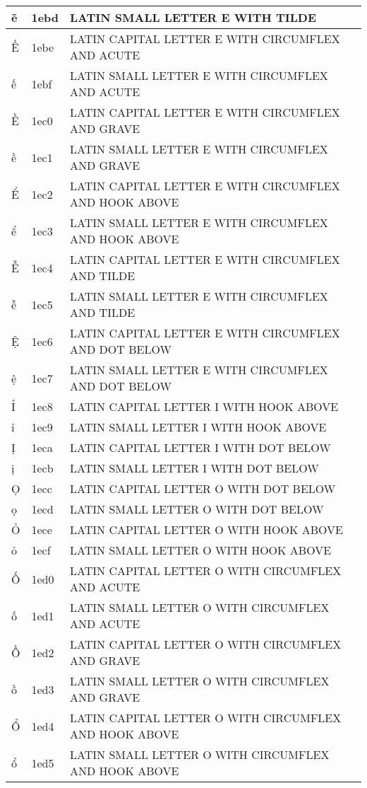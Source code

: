 \documentclass[12pt,letterpaper,openany]{book}
\begin{document}
\begin{center}
\begin{supertabular}{|m{0.25in}|m{0.5in}|m{4in}|}
ẽ & 1ebd & LATIN SMALL LETTER E WITH TILDE\\\hline
Ế & 1ebe & LATIN CAPITAL LETTER E WITH CIRCUMFLEX AND ACUTE\\\hline
ế & 1ebf & LATIN SMALL LETTER E WITH CIRCUMFLEX AND ACUTE\\\hline
Ề & 1ec0 & LATIN CAPITAL LETTER E WITH CIRCUMFLEX AND GRAVE\\\hline
ề & 1ec1 & LATIN SMALL LETTER E WITH CIRCUMFLEX AND GRAVE\\\hline
Ể & 1ec2 & LATIN CAPITAL LETTER E WITH CIRCUMFLEX AND HOOK ABOVE\\\hline
ể & 1ec3 & LATIN SMALL LETTER E WITH CIRCUMFLEX AND HOOK ABOVE\\\hline
Ễ & 1ec4 & LATIN CAPITAL LETTER E WITH CIRCUMFLEX AND TILDE\\\hline
ễ & 1ec5 & LATIN SMALL LETTER E WITH CIRCUMFLEX AND TILDE\\\hline
Ệ & 1ec6 & LATIN CAPITAL LETTER E WITH CIRCUMFLEX AND DOT BELOW\\\hline
ệ & 1ec7 & LATIN SMALL LETTER E WITH CIRCUMFLEX AND DOT BELOW\\\hline
Ỉ & 1ec8 & LATIN CAPITAL LETTER I WITH HOOK ABOVE\\\hline
ỉ & 1ec9 & LATIN SMALL LETTER I WITH HOOK ABOVE\\\hline
Ị & 1eca & LATIN CAPITAL LETTER I WITH DOT BELOW\\\hline
ị & 1ecb & LATIN SMALL LETTER I WITH DOT BELOW\\\hline
Ọ & 1ecc & LATIN CAPITAL LETTER O WITH DOT BELOW\\\hline
ọ & 1ecd & LATIN SMALL LETTER O WITH DOT BELOW\\\hline
Ỏ & 1ece & LATIN CAPITAL LETTER O WITH HOOK ABOVE\\\hline
ỏ & 1ecf & LATIN SMALL LETTER O WITH HOOK ABOVE\\\hline
Ố & 1ed0 & LATIN CAPITAL LETTER O WITH CIRCUMFLEX AND ACUTE\\\hline
ố & 1ed1 & LATIN SMALL LETTER O WITH CIRCUMFLEX AND ACUTE\\\hline
Ồ & 1ed2 & LATIN CAPITAL LETTER O WITH CIRCUMFLEX AND GRAVE\\\hline
ồ & 1ed3 & LATIN SMALL LETTER O WITH CIRCUMFLEX AND GRAVE\\\hline
Ổ & 1ed4 & LATIN CAPITAL LETTER O WITH CIRCUMFLEX AND HOOK ABOVE\\\hline
ổ & 1ed5 & LATIN SMALL LETTER O WITH CIRCUMFLEX AND HOOK ABOVE\\\hline

\end{supertabular}
\end{center}
\end{document}

